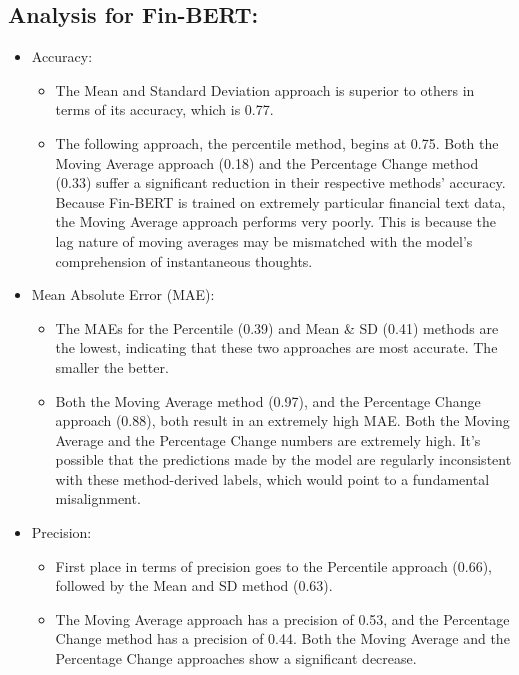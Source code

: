 \documentclass[12pt, a4paper,twoside]{report}
\theoremstyle{plain} %
\theoremstyle{definition} %
\theoremstyle{remark} %
\numberwithin{equation}{chapter}
\begin{document}
    \subsection{\textbf{Analysis for Fin-BERT:}}
    \begin{itemize}
        \item Accuracy:
            \begin{itemize}
                \item The Mean and Standard Deviation approach is superior to others in terms of its accuracy, which is 0.77.
                \item The following approach, the percentile method, begins at 0.75.
                Both the Moving Average approach (0.18) and the Percentage Change method (0.33) suffer a significant reduction in their respective methods' accuracy. Because Fin-BERT is trained on extremely particular financial text data, the Moving Average approach performs very poorly. This is because the lag nature of moving averages may be mismatched with the model's comprehension of instantaneous thoughts.
            \end{itemize}
        \item Mean Absolute Error (MAE):
            \begin{itemize}
                \item The MAEs for the Percentile (0.39) and Mean \& SD (0.41) methods are the lowest, indicating that these two approaches are most accurate. The smaller the better.
                \item Both the Moving Average method (0.97), and the Percentage Change approach (0.88), both result in an extremely high MAE. Both the Moving Average and the Percentage Change numbers are extremely high. It's possible that the predictions made by the model are regularly inconsistent with these method-derived labels, which would point to a fundamental misalignment.
            \end{itemize}
        \item Precision:
            \begin{itemize}
                \item First place in terms of precision goes to the Percentile approach (0.66), followed by the Mean and SD method (0.63).
                \item The Moving Average approach has a precision of 0.53, and the Percentage Change method has a precision of 0.44. Both the Moving Average and the Percentage Change approaches show a significant decrease.

\end{itemize}
\end{itemize}
\end{document}
